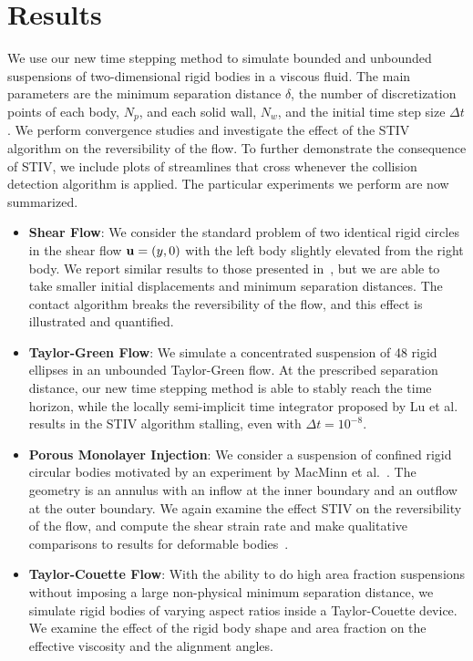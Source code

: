 \documentclass[preprint, 10pt]{elsarticle}
\begin{document}
\section{Results\label{s:results}} 
We use our new time stepping method to simulate bounded and unbounded
suspensions of two-dimensional rigid bodies in a viscous fluid.  The
main parameters are the minimum separation distance $\delta$, the number
of discretization points of each body, $N_p$, and each solid wall,
$N_w$, and the initial time step size $\Delta t$. We perform convergence
studies and investigate the effect of the STIV algorithm on the
reversibility of the flow.  To further demonstrate the consequence of
STIV, we include plots of streamlines that cross whenever the collision
detection algorithm is applied.  The particular experiments we perform
are now summarized.
\begin{itemize}
  \item {\bf Shear Flow}: We consider the standard problem of two
  identical rigid circles in the shear flow ${\mathbf{u}} = (y,0)$ with the left
  body slightly elevated from the right body.  We report similar results
  to those presented in~\cite{Lu2017}, but we are able to take smaller
  initial displacements and minimum separation distances.  The contact
  algorithm breaks the reversibility of the flow, and this effect is
  illustrated and quantified.

  \item {\bf Taylor-Green Flow}: We simulate a concentrated suspension
  of 48 rigid ellipses in an unbounded Taylor-Green flow. At the
  prescribed separation distance, our new time stepping method is able
  to stably reach the time horizon, while the locally semi-implicit time
  integrator proposed by Lu et al.~\cite{Lu2017} results in the STIV
  algorithm stalling, even with $\Delta t = 10^{-8}$.

  \item {\bf Porous Monolayer Injection}: We consider a suspension of
  confined rigid circular bodies motivated by an experiment by MacMinn
  et al.~\cite{MacMinn2015}.  The geometry is an annulus with an inflow
  at the inner boundary and an outflow at the outer boundary.  We again
  examine the effect STIV on the reversibility of the flow, and compute
  the shear strain rate and make qualitative comparisons to results for
  deformable bodies~\cite{MacMinn2015}.

  \item {\bf Taylor-Couette Flow}: With the ability to do high area
  fraction suspensions without imposing a large non-physical minimum
  separation distance, we simulate rigid bodies of varying aspect ratios
  inside a Taylor-Couette device.  We examine the effect of the rigid
  body shape and area fraction on the effective viscosity and the
  alignment angles.
\end{itemize}
\end{document}
